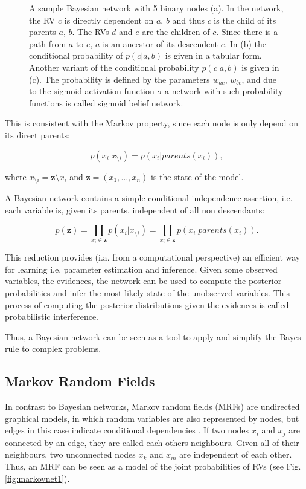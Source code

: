\begin{figure}
\begin{subfigure}[t]{.33\textwidth}
  		\caption{}
  		\label{fig:sub3}
	\end{subfigure}
	\caption[A sample Bayesian network with 5 binary nodes.]{A sample Bayesian network with 5 binary nodes (a). In the network, the RV $c$ is directly dependent on $a$, $b$ and thus $c$ is the child of its parents $a$, $b$. The RVs $d$ and $e$ are the children of $c$. Since there is a path from $a$ to $e$, $a$ is an ancestor of its descendent $e$. In (b) the conditional probability of $p(c |a , b)$ is given in a tabular form. Another variant of the conditional probability $p(c |a , b)$ is given in (c). The probability is defined by the parameters $w_{ac}$, $w_{bc}$, and due to the sigmoid activation function $\sigma$ a network with such probability functions is called sigmoid belief network.}
	\label{fig:bayesnet}
\end{figure}

This is consistent with the Markov property, since each node is only depend on its direct parents:

\[
p(x_i | x_{\setminus i}) = p(x_i | parents(x_i) ),
\]

where $x_{\setminus i} = \textbf{z} \setminus x_i$ and $\textbf{z} = (x_1, ... , x_n)$ is the state of the model.


A Bayesian network contains a simple conditional independence assertion, i.e. each variable is, given its parents, independent of all non descendants:

\[
p(\textbf{z}) = \prod_{x_i \in \textbf{z}} p(x_i | x_{\setminus i}) = \prod_{x_i \in \textbf{z}} p(x_i | parents(x_i) ) .
\]

This reduction provides (i.a. from a computational perspective) an efficient way for learning i.e. parameter estimation and inference.
Given some observed variables, the evidences, the network can be used to compute the posterior probabilities and infer the most likely state of the unobserved variables.
This process of computing the posterior distributions given the evidences is called probabilistic interference.

Thus, a Bayesian network can be seen as a tool to apply and simplify the Bayes rule to complex problems.   

\subsection{Markov Random Fields} \label{c:markovnet}

In contrast to Bayesian networks, Markov random fields (MRFs) are undirected graphical models, in which random variables are also represented by nodes, but edges in this case indicate conditional dependencies \cite{Goodfellow-et-al-2016-Book, murphy2012machine}.
If two nodes $x_i$ and $x_j$ are connected by an edge, they are called each others neighbours.
Given all of their neighbours, two unconnected nodes $x_k$ and $x_m$ are independent of each other.
Thus, an MRF can be seen as a model of the joint probabilities of RVs (see Fig. \ref{fig:markovnet1}).

